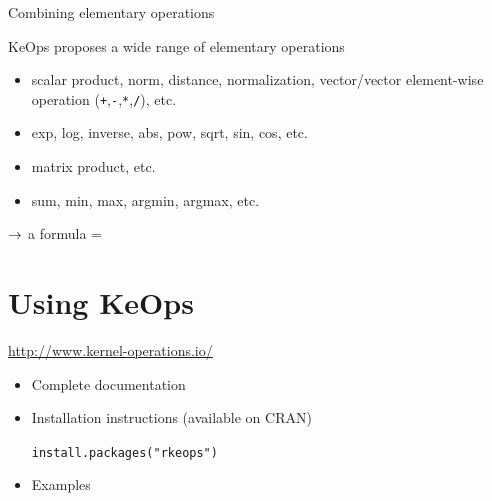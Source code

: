 \documentclass[12pt,aspectratio=1610]{beamer}
\begin{document}
\begin{frame}{Combining elementary operations}

KeOps proposes a wide range of elementary operations\bigskip

\begin{itemize}
\setitsep{1em}
\item {} {\small scalar product, norm, distance, normalization, vector/vector element-wise operation (\texttt{+},\texttt{-},\texttt{*},\texttt{/}), etc.}
\item {} {\small exp, log, inverse, abs, pow, sqrt, sin, cos, etc.}
\item {} {\small matrix product, etc.}
\item {} {\small sum, min, max, argmin, argmax, etc.}
\end{itemize}

\bigskip\bigskip\bigskip
$\rightarrow$ a formula = 

\end{frame}



\section{Using KeOps}

\begin{frame}{\url{http://www.kernel-operations.io/}}

\begin{itemize}
\setitsep{2em}
\item Complete documentation
\item Installation instructions (available on CRAN)\medskip
\begin{center}
\texttt{install.packages("rkeops")}
\end{center}

\item Examples
\end{itemize}

\end{frame}
\end{document}
